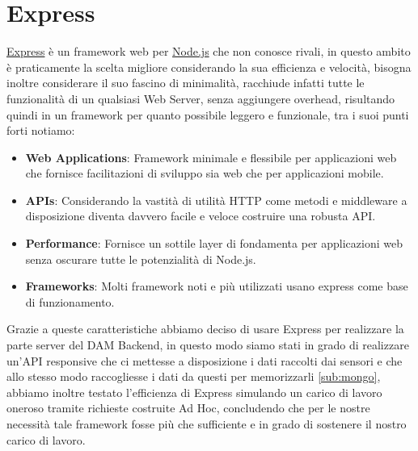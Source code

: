 \documentclass[a4paper,12pt]{report}
\newcommand{\node}{\href{https://nodejs.org/it/}{Node.js} }
\newcommand{\express}{\href{https://expressjs.com/it/}{Express} }
\begin{document}
\section{Express}
\express è un framework web per \node che non conosce rivali, in questo ambito è praticamente la scelta migliore considerando la sua efficienza e velocità, bisogna inoltre considerare il suo fascino di minimalità, racchiude infatti tutte le funzionalità di un qualsiasi Web Server, senza aggiungere overhead, risultando quindi in un framework per quanto possibile leggero e funzionale, tra i suoi punti forti notiamo:
\begin{itemize}
	\item \textbf{Web Applications}: Framework minimale e flessibile per applicazioni web che fornisce facilitazioni di sviluppo sia web che per applicazioni mobile.
	\item \textbf{APIs}: Considerando la vastità di utilità HTTP come metodi e middleware a disposizione diventa davvero facile e veloce costruire una robusta API.
	\item \textbf{Performance}: Fornisce un sottile layer di fondamenta per applicazioni web senza oscurare tutte le potenzialità di Node.js.
	\item \textbf{Frameworks}: Molti framework noti e più utilizzati usano express come base di funzionamento.
\end{itemize}
Grazie a queste caratteristiche abbiamo deciso di usare Express per realizzare la parte server del DAM Backend, in questo modo siamo stati in grado di realizzare un'API responsive che ci mettesse a disposizione i dati raccolti dai sensori e che allo stesso modo raccogliesse i dati da questi per memorizzarli \ref{sub:mongo}, abbiamo inoltre testato l'efficienza di Express simulando un carico di lavoro oneroso tramite richieste costruite Ad Hoc, concludendo che per le nostre necessità tale framework fosse più che sufficiente e in grado di sostenere il nostro carico di lavoro.
\end{document}
